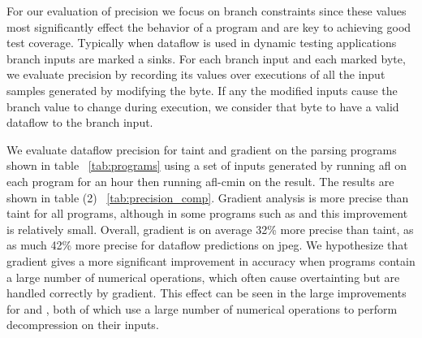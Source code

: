 For our evaluation of precision we focus on branch constraints since these values most significantly effect the behavior of a program and are key to achieving good test coverage. Typically when dataflow is used in dynamic testing applications branch inputs are marked a sinks.  For each branch input and each marked byte, we evaluate precision by recording its values over executions of all the input samples generated by modifying the byte. If any the modified inputs cause the branch value to change during execution, we consider that byte to have a valid dataflow to the branch input. 

We evaluate dataflow precision for taint and gradient on the parsing programs shown in table ~\ref{tab:programs} using a set of inputs generated by running afl on each program for an hour then running afl-cmin on the result. The results are shown in table (2) ~\ref{tab:precision_comp}. Gradient analysis is more precise than taint for all programs, although in some programs such as  and  this improvement is relatively small. Overall, gradient is on average 32\% more precise than taint, as as much 42\% more precise for dataflow predictions on jpeg. We hypothesize that gradient gives a more significant improvement in accuracy when programs contain a large number of numerical operations, which often cause overtainting but are handled correctly by gradient. This effect can be seen in the large improvements for  and , both of which use a large number of numerical operations to perform decompression on their inputs.


